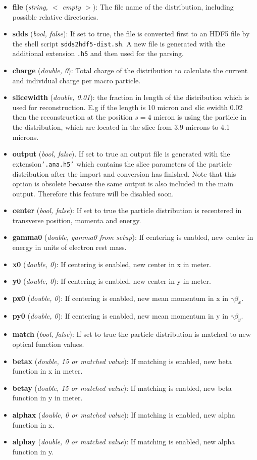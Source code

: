 \documentclass[12pt]{book}
\begin{document}
\begin{itemize}
\item{\bf file} ({\it string, $<$ empty $>$}): The file name of the distribution, including possible relative directories.
\item {\bf sdds} ({\it bool, false}): If set to true, the file is converted first to an HDF5 file by the shell script {\tt sdds2hdf5-dist.sh}. A new file is generated with the additional extension {\tt .h5} and then used for the parsing.
\item {\bf charge} ({\it double, 0}): Total charge of the distribution to calculate the current and individual charge per macro particle.
\item {\bf slicewidth} ({\it double, 0.01}): the fraction in length of the distribution which is used for reconstruction. E.g if the length is 10 micron and slic ewidth 0.02 then the reconstruction at the position $s=4$ micron is using the particle in the distribution, which are located in the slice from 3.9 microns to 4.1 microns.
\item {\bf output} ({\it bool, false}). If set to true an output file is generated with the extension{\tt '.ana.h5'} which contains the slice parameters of the particle distribution after the import and conversion has finished. Note that this option is obsolete because the same output is also included in the main output. Therefore this feature will be disabled soon.
\item {\bf center} ({\it bool, false}): If set to true the particle distribution is recentered in transverse position, momenta and energy.
\item {\bf gamma0} ({\it double, gamma0 from setup}): If centering is enabled, new center in energy in units of electron rest mass.
\item {\bf x0} ({\it double, 0}): If centering is enabled, new center in x in meter.
\item {\bf y0} ({\it double, 0}): If centering is enabled, new center in y in meter.
\item {\bf px0} ({\it double, 0}): If centering is enabled, new mean momentum in x in $\gamma\beta_x$.
\item {\bf py0} ({\it double, 0}): If centering is enabled, new mean momentum in y in $\gamma\beta_y$.

\item {\bf match} ({\it bool, false}): If set to true the particle distribution is matched to new optical function values.
\item {\bf betax} ({\it double, 15 or matched value}): If matching is enabled, new beta function in x in meter.
\item {\bf betay} ({\it double, 15 or matched value}): If matching is enabled, new beta function in y in meter.
\item {\bf alphax} ({\it double, 0 or matched value}): If matching is enabled, new alpha function in x.
\item {\bf alphay} ({\it double, 0 or matched value}): If matching is enabled, new alpha function in y.

\end{itemize}
\end{document}
